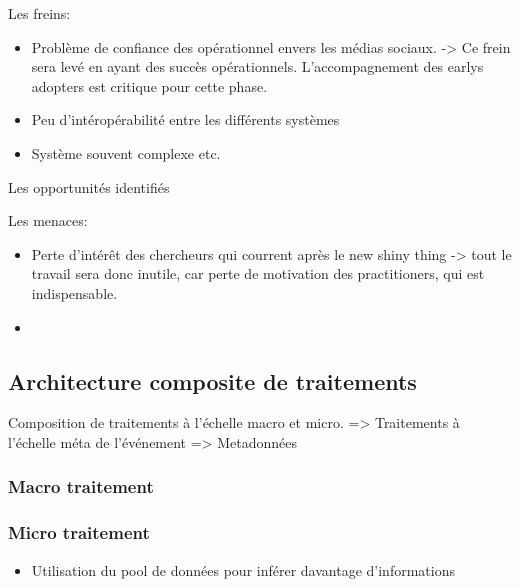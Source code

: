 Les freins:
\begin{itemize}
    \item Problème de confiance des opérationnel envers les médias sociaux. -> Ce frein sera levé en ayant des succès opérationnels.
          L'accompagnement des earlys adopters est critique pour cette phase.
    \item Peu d'intéropérabilité entre les différents systèmes
    \item Système souvent complexe etc.
\end{itemize}

Les opportunités identifiés

Les menaces:
\begin{itemize}
    \item Perte d'intérêt des chercheurs qui courrent après le new shiny thing -> tout le travail sera donc inutile, car perte de motivation des practitioners, qui est indispensable.
    \item
\end{itemize}


\subsection{Architecture composite de traitements}
Composition de traitements à l'échelle macro et micro.
=> Traitements à l'échelle méta de l'événement
=> Metadonnées

\subsubsection{Macro traitement}

\subsubsection{Micro traitement}

\begin{itemize}
    \item Utilisation du pool de données pour inférer davantage d'informations
\end{itemize}


